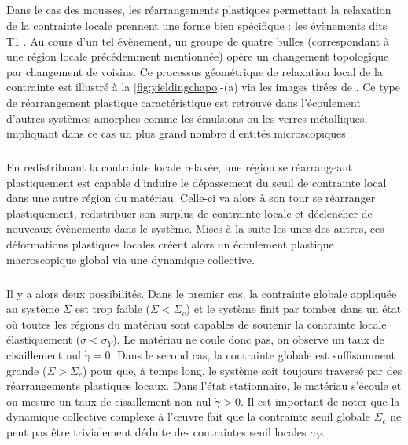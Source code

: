 \subparagraph{}Dans le cas des mousses, les réarrangements plastiques permettant la relaxation de la contrainte locale prennent une forme bien spécifique : les évènements dits T1 \cite{princen_rheology_1986}. Au cours d'un tel évènement, un groupe de quatre bulles (correspondant à une région locale précédemment mentionnée) opère un changement topologique par changement de voisins. Ce processus géométrique de relaxation local de la contrainte est illustré à la \autoref{fig:yieldingchapo}-(a) via les images tirées de \cite{dollet_rheology_2014}. Ce type de réarrangement plastique caractéristique est retrouvé dans l'écoulement d'autres systèmes amorphes comme les émulsions ou les verres métalliques, impliquant dans ce cas un plus grand nombre d'entités microscopiques \cite{nicolas_deformation_2018}. 

\subparagraph{}En redistribuant la contrainte locale relaxée, une région se réarrangeant plastiquement est capable d'induire le dépassement du seuil de contrainte local dans une autre région du matériau. Celle-ci va alors à son tour se réarranger plastiquement, redistribuer son surplus de contrainte locale et déclencher de nouveaux évènements dans le système. Mises à la suite les unes des autres, ces déformations plastiques locales créent alors un écoulement plastique macroscopique global via une dynamique collective.

\subparagraph{}Il y a alors deux possibilités. Dans le premier cas, la contrainte globale appliquée au système $\Sigma$ est trop faible ($\Sigma<\Sigma_c$) et le système finit par tomber dans un état où toutes les régions du matériau sont capables de soutenir la contrainte locale élastiquement ($\sigma < \sigma_Y$). Le matériau ne coule donc pas, on observe un taux de cisaillement nul $\dot{\gamma} = 0$. Dans le second cas, la contrainte globale est suffisamment grande ($\Sigma>\Sigma_c$) pour que, à temps long, le système soit toujours traversé par des réarrangements plastiques locaux. Dans l'état stationnaire, le matériau s'écoule et on mesure un taux de cisaillement non-nul $\dot{\gamma}>0$. Il est important de noter que la dynamique collective complexe à l’œuvre fait que la contrainte seuil globale $\Sigma_c$ ne peut pas être trivialement déduite des contraintes seuil locales $\sigma_Y$.

